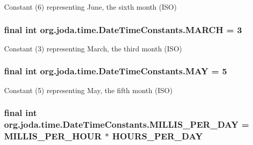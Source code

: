 Constant (6) representing June, the sixth month (I\-S\-O) \hypertarget{classorg_1_1joda_1_1time_1_1_date_time_constants_a337c48dd830fd480ca1a9a1083c609d6}{
\subsubsection[{M\-A\-R\-C\-H}]{\setlength{\rightskip}{0pt plus 5cm}final int org.\-joda.\-time.\-Date\-Time\-Constants.\-M\-A\-R\-C\-H = 3\hspace{0.3cm}{\ttfamily [static]}}}\label{classorg_1_1joda_1_1time_1_1_date_time_constants_a337c48dd830fd480ca1a9a1083c609d6}
Constant (3) representing March, the third month (I\-S\-O) \hypertarget{classorg_1_1joda_1_1time_1_1_date_time_constants_affcbb4ffc72ea1199b3b3ed3e9f4563d}{
\subsubsection[{M\-A\-Y}]{\setlength{\rightskip}{0pt plus 5cm}final int org.\-joda.\-time.\-Date\-Time\-Constants.\-M\-A\-Y = 5\hspace{0.3cm}{\ttfamily [static]}}}\label{classorg_1_1joda_1_1time_1_1_date_time_constants_affcbb4ffc72ea1199b3b3ed3e9f4563d}
Constant (5) representing May, the fifth month (I\-S\-O) \hypertarget{classorg_1_1joda_1_1time_1_1_date_time_constants_a47be2ee9ec748dc2dad2d655ab359f55}{
\subsubsection[{M\-I\-L\-L\-I\-S\-\_\-\-P\-E\-R\-\_\-\-D\-A\-Y}]{\setlength{\rightskip}{0pt plus 5cm}final int org.\-joda.\-time.\-Date\-Time\-Constants.\-M\-I\-L\-L\-I\-S\-\_\-\-P\-E\-R\-\_\-\-D\-A\-Y = {\bf M\-I\-L\-L\-I\-S\-\_\-\-P\-E\-R\-\_\-\-H\-O\-U\-R} $\ast$ {\bf H\-O\-U\-R\-S\-\_\-\-P\-E\-R\-\_\-\-D\-A\-Y}\hspace{0.3cm}{\ttfamily [static]}}}\label{classorg_1_1joda_1_1time_1_1_date_time_constants_a47be2ee9ec748dc2dad2d655ab359f55}
